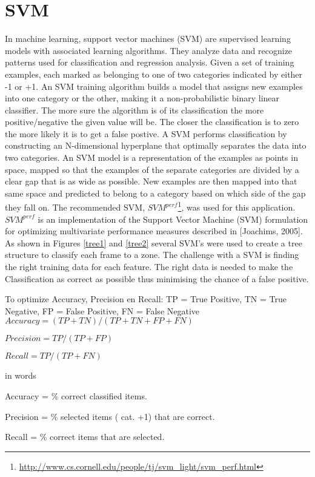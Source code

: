 \clearpage
\section{SVM}
In machine learning, support vector machines (SVM) are supervised learning models with associated learning algorithms. They analyze data and recognize patterns used for classification and regression analysis. Given a set of training examples, each marked as belonging to one of two categories indicated by either -1 or +1.
\npar
An SVM training algorithm builds a model that assigns new examples into one category or the other, making it a non-probabilistic binary linear classifier. The more sure the algorithm is of its classification the more positive/negative the given value will be.
The closer the classification is to zero the more likely it is to get a false postive.
\npar
A SVM performs classification by constructing an N-dimensional hyperplane that optimally separates the data into two categories. An SVM model is a representation of the examples as points in space, mapped so that the examples of the separate categories are divided by a clear gap that is as wide as possible. New examples are then mapped into that same space and predicted to belong to a category based on which side of the gap they fall on.
\npar
The recommended SVM, \(SVM^{perf}\)\footnote{\url{http://www.cs.cornell.edu/people/tj/svm_light/svm_perf.html}}, was used for this application.
\(SVM^{perf}\) is an implementation of the Support Vector Machine (SVM) formulation for optimizing multivariate performance measures described in [Joachims, 2005].
\npar
As shown in Figures \ref{tree1} and \ref{tree2} several SVM's were used to create a tree structure to classify each frame to a zone.
\npar
The challenge with a SVM is finding the right training data for each feature. The right data is needed to make the Classification as correct as possible thus minimising the chance of a false positive. 

To optimize Accuracy, Precision en Recall:
\npar
TP = True Positive,
TN = True Negative,
FP = False Positive,
FN = False Negative
\npar
$Accuracy = (TP + TN) / (TP + TN + FP + FN)$

$Precision = TP / (TP+FP)$

$Recall = TP / (TP+FN)$


in words

Accuracy = \% correct classified items.

Precision = \% selected items ( cat. +1) that are correct.

Recall = \% correct items that are selected.

\clearpage
